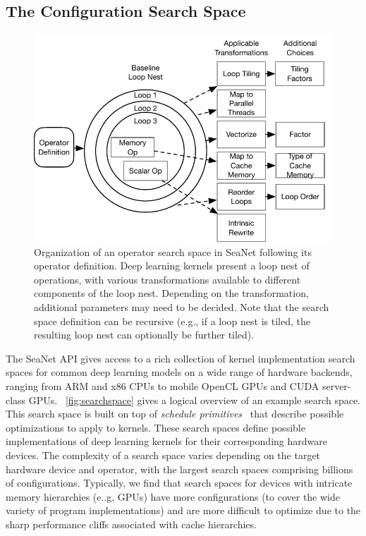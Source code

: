 \subsection{The Configuration Search Space}
\label{sec:searchspace}
\begin{figure}[tb]
    \centering
    \includegraphics[width=\textwidth]{sys_diagrams/searchspace.pdf}
    \caption{Organization of an operator search space in SeaNet following its operator definition. Deep learning kernels present a loop nest of operations, with various transformations available to different components of the loop nest. Depending on the transformation, additional parameters may need to be decided. Note that the search space definition can be recursive (e.g., if a loop nest is tiled, the resulting loop nest can optionally be further tiled).}
    \label{fig:searchspace}
\end{figure}
The SeaNet API gives access to a rich collection of kernel implementation search spaces for common deep learning models on a wide range of hardware backends, ranging from ARM and x86 CPUs to mobile OpenCL GPUs and CUDA server-class GPUs.
~\autoref{fig:searchspace} gives a logical overview of an example search space.
This search space is built on top of \emph{schedule primitives}~\cite{ragan2017halide, chen2018tvm} that describe possible optimizations to apply to kernels.
These search spaces define possible implementations of deep learning kernels for their corresponding hardware devices.
The complexity of a search space varies depending on the target hardware device and operator, with the largest search spaces comprising billions of configurations.
Typically, we find that search spaces for devices with intricate memory hierarchies (e..g, GPUs) have more configurations (to cover the wide variety of program implementations) and are more difficult to optimize due to the sharp performance cliffs associated with cache hierarchies.


